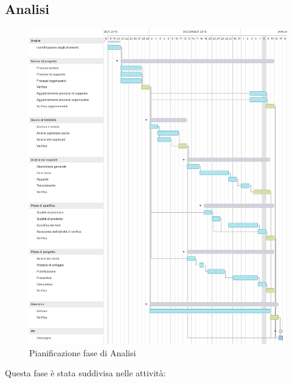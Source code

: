 \subsection{Analisi}
\begin{figure}[h!]
	\includegraphics[width=\textwidth]{res/img/g1113}
	\caption{Pianificazione fase di Analisi}
\end{figure}
Questa fase è stata suddivisa nelle attività:

